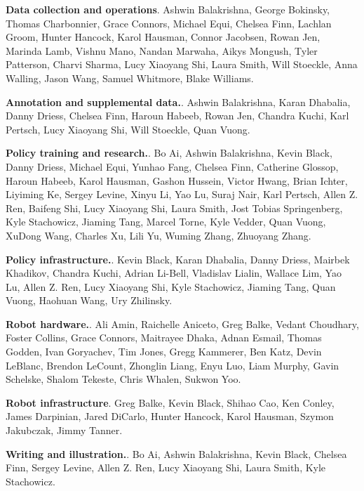 
\label{app:contributions}

\noindent\textbf{Data collection and operations}. Ashwin Balakrishna, George Bokinsky, Thomas Charbonnier, Grace Connors, Michael Equi, Chelsea Finn, Lachlan Groom, Hunter Hancock, Karol Hausman, Connor Jacobsen, Rowan Jen, Marinda Lamb, Vishnu Mano, Nandan Marwaha, Aikys Mongush, Tyler Patterson, Charvi Sharma, Lucy Xiaoyang Shi, Laura Smith, Will Stoeckle, Anna Walling, Jason Wang, Samuel Whitmore, Blake Williams.

\noindent\textbf{Annotation and supplemental data.}. Ashwin Balakrishna, Karan Dhabalia, Danny Driess, Chelsea Finn, Haroun Habeeb, Rowan Jen, Chandra Kuchi, Karl Pertsch, Lucy Xiaoyang Shi, Will Stoeckle, Quan Vuong.

\noindent\textbf{Policy training and research.}. Bo Ai, Ashwin Balakrishna, Kevin Black, Danny Driess, Michael Equi, Yunhao Fang, Chelsea Finn, Catherine Glossop, Haroun Habeeb, Karol Hausman, Gashon Hussein, Victor Hwang, Brian Ichter, Liyiming Ke, Sergey Levine, Xinyu Li, Yao Lu, Suraj Nair, Karl Pertsch, Allen Z. Ren, Baifeng Shi, Lucy Xiaoyang Shi, Laura Smith, Jost Tobias Springenberg, Kyle Stachowicz, Jiaming Tang, Marcel Torne, Kyle Vedder, Quan Vuong, XuDong Wang, Charles Xu, Lili Yu, Wuming Zhang, Zhuoyang Zhang.

\noindent\textbf{Policy infrastructure.}. Kevin Black, Karan Dhabalia, Danny Driess, Mairbek Khadikov, Chandra Kuchi, Adrian Li-Bell, Vladislav Lialin, Wallace Lim, Yao Lu, Allen Z. Ren, Lucy Xiaoyang Shi, Kyle Stachowicz, Jiaming Tang, Quan Vuong, Haohuan Wang, Ury Zhilinsky.

\noindent\textbf{Robot hardware.}. Ali Amin, Raichelle Aniceto, Greg Balke, Vedant Choudhary, Foster Collins, Grace Connors, Maitrayee Dhaka, Adnan Esmail, Thomas Godden, Ivan Goryachev, Tim Jones, Gregg Kammerer, Ben Katz, Devin LeBlanc, Brendon LeCount, Zhonglin Liang, Enyu Luo, Liam Murphy, Gavin Schelske, Shalom Tekeste, Chris Whalen, Sukwon Yoo.

\noindent\textbf{Robot infrastructure}. Greg Balke, Kevin Black, Shihao Cao, Ken Conley, James Darpinian, Jared DiCarlo, Hunter Hancock, Karol Hausman, Szymon Jakubczak, Jimmy Tanner.

\noindent\textbf{Writing and illustration.}. Bo Ai, Ashwin Balakrishna, Kevin Black, Chelsea Finn, Sergey Levine, Allen Z. Ren, Lucy Xiaoyang Shi, Laura Smith, Kyle Stachowicz.

